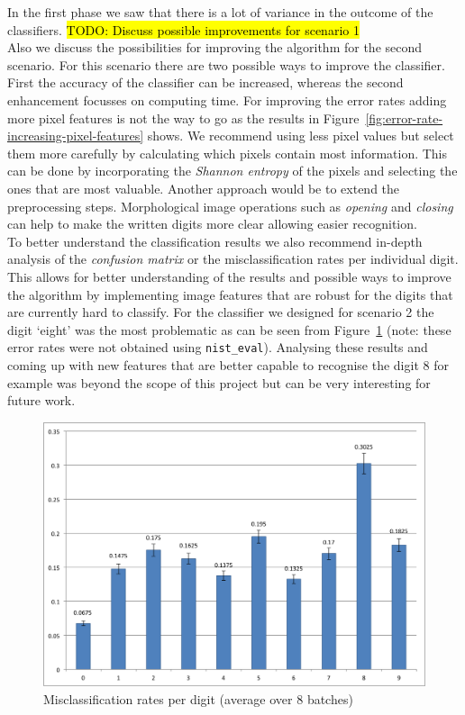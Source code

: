 \documentclass{article}
\newcommand{\todo}[1] {\hl{TODO: #1}}
\begin{document}
In the first phase we saw that there is a lot of variance in the outcome of the classifiers. 
\todo{Discuss possible improvements for scenario 1} \\

Also we discuss the possibilities for improving the algorithm for the second scenario. For this scenario there are two possible ways to improve the classifier. First the accuracy of the classifier can be increased, whereas the second enhancement focusses on computing time. For improving the error rates adding more pixel features is not the way to go as the results in Figure~\ref{fig:error-rate-increasing-pixel-features} shows. We recommend using less pixel values but select them more carefully by calculating which pixels contain most information. This can be done by incorporating the \emph{Shannon entropy} of the pixels and selecting the ones that are most valuable. Another approach would be to extend the preprocessing steps. Morphological image operations such as \emph{opening} and \emph{closing} can help to make the written digits more clear allowing easier recognition. \\

To better understand the classification results we also recommend in-depth analysis of the \emph{confusion matrix} or the misclassification rates per individual digit. This allows for better understanding of the results and possible ways to improve the algorithm by implementing image features that are robust for the digits that are currently hard to classify. For the classifier we designed for scenario 2 the digit `eight' was the most problematic as can be seen from Figure~\ref{fig:digit-misclassification} (note: these error rates were not obtained using \texttt{nist\_eval}). Analysing these results and coming up with new features that are better capable to recognise the digit $8$ for example was beyond the scope of this project but can be very interesting for future work.

\begin{figure}[H]
    \center
    \includegraphics[width=.7\textwidth]{misclassification-digits}
    \caption{Misclassification rates per digit (average over $8$ batches) \label{fig:digit-misclassification}}
\end{figure}
\end{document}
